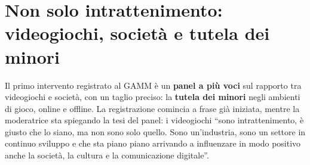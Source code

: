 
\chapter[Videogiochi, società e tutela dei minori]{Non solo intrattenimento:
videogiochi, società e tutela dei minori}
\label{cap:c1-1-tutela-minori}

Il primo intervento registrato al GAMM è un \textbf{panel a più voci} sul
rapporto tra videogiochi e società, con un taglio preciso: la
\textbf{tutela dei minori} negli ambienti di gioco, online e offline. La
registrazione comincia a frase già iniziata, mentre la moderatrice sta
spiegando la tesi del panel: i videogiochi ``sono intrattenimento, è giusto che
lo siano, ma non sono solo quello. Sono un'industria, sono un settore in
continuo sviluppo e che sta piano piano arrivando a influenzare in modo
positivo anche la società, la cultura e la comunicazione digitale''.

